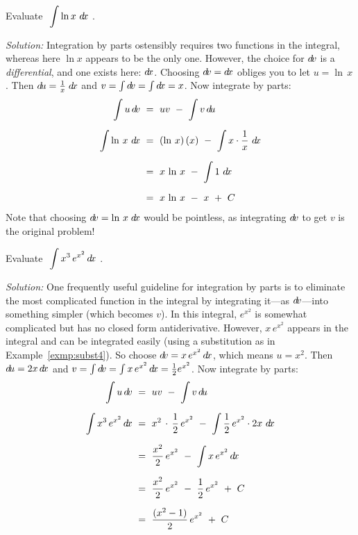 \begin{exmp}\label{exmp:intparts3}
\noindent Evaluate $~\displaystyle\int \ln x~d\!x~$.\vspace{1mm}
\par\noindent\emph{Solution:} Integration by parts ostensibly requires two
functions in the integral, whereas here $\ln x$ appears to be the only one.
However, the choice for $d\!v$ is a \emph{differential}, and one exists here:
$d\!x$. Choosing $d\!v = d\!x$ obliges you to let $u = \ln\,x$. Then
$d\!u = \frac{1}{x}\;d\!x$ and $v = \int d\!v = \int d\!x = x$. Now integrate by
parts:
\begin{align*}
\int u\,d\!v ~&=~ uv ~-~ \int v\,d\!u\\[6pt]
\int \ln\,x~d\!x ~&=~ (\ln\,x)\,(x) ~-~ \int x \cdot \frac{1}{x}~d\!x\\[6pt]
&=~ x\,\ln\,x ~-~ \int 1~d\!x\\[6pt]
&=~ x\,\ln\,x ~-~ x ~+~ C
\end{align*}
Note that choosing $d\!v = \ln\,x\;d\!x$ would be pointless, as integrating
$d\!v$ to get $v$ is the original problem!
\end{exmp}
\begin{exmp}\label{exmp:intparts4}
\noindent Evaluate $~\displaystyle\int x^3\,e^{x^2}\,d\!x~$.\vspace{1mm}
\par\noindent\emph{Solution:} One frequently useful guideline for integration
by parts is to eliminate the most complicated function in the integral by
integrating it---as $d\!v$---into something simpler (which becomes $v$). In
this integral, $e^{x^2}$ is somewhat complicated but has no
closed form antiderivative. However, $x\,e^{x^2}$ appears in the
integral and can be integrated easily (using a substitution as in Example~\ref{exmp:subst4}).
So choose $d\!v = x\,e^{x^2}\,d\!x$, which means $u = x^2$. Then
$d\!u = 2x\,d\!x$ and $v = \int d\!v = \int x\,e^{x^2}\,d\!x = \frac{1}{2}e^{x^2}$.
Now integrate by parts:
\begin{align*}
\int u\,d\!v ~&=~ uv ~-~ \int v\,d\!u\\[6pt]
\int x^3\,e^{x^2}\,d\!x ~&=~ x^2\,\cdot\,\frac{1}{2}\,e^{x^2} ~-~
\int \frac{1}{2}\,e^{x^2} \cdot 2x~d\!x\\[6pt]
&=~ \frac{x^2}{2}\,e^{x^2} ~-~ \int x\,e^{x^2}\,d\!x\\[6pt]
&=~ \frac{x^2}{2}\,e^{x^2} ~-~ \frac{1}{2}\,e^{x^2} ~+~ C\\[6pt]
&=~ \frac{(x^2 - 1)}{2}\,e^{x^2} ~+~ C
\end{align*}
\end{exmp}
